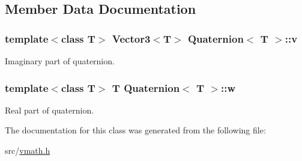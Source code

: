 \subsection{Member Data Documentation}
\hypertarget{class_quaternion_a14b395e80f7c6a1687a824f2adb1eb9b}{
\subsubsection[{v}]{\setlength{\rightskip}{0pt plus 5cm}template$<$class T$>$ {\bf Vector3}$<$T$>$ {\bf Quaternion}$<$ T $>$::{\bf v}}}
\label{class_quaternion_a14b395e80f7c6a1687a824f2adb1eb9b}


Imaginary part of quaternion. 

\hypertarget{class_quaternion_ab3d38cb2d28ba85f00f48768f8fa2815}{
\subsubsection[{w}]{\setlength{\rightskip}{0pt plus 5cm}template$<$class T$>$ T {\bf Quaternion}$<$ T $>$::{\bf w}}}
\label{class_quaternion_ab3d38cb2d28ba85f00f48768f8fa2815}


Real part of quaternion. 



The documentation for this class was generated from the following file:\begin{DoxyCompactItemize}
\item 
src/\hyperlink{vmath_8h}{vmath.h}\end{DoxyCompactItemize}

